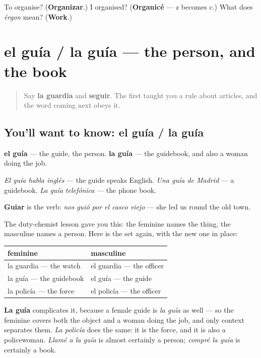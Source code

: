 \begin{tcolorbox}[breakable,colback=teal!4,colframe=teal!35!black,title={Before you move on}]
To organise? (\textbf{Organizar}.) I organised? (\textbf{Organicé} — z becomes c.) What does \emph{érgon} mean? (\textbf{Work}.)
\end{tcolorbox}
\section[el guía / la guía]{el guía / la guía — the person, and the book}

\label{lesson:ES-C463-guia}



\begin{quote}
Say \textbf{la guardia} and \textbf{seguir}. The first taught you a rule about articles, and the word coming next obeys it.
\end{quote}

\subsection*{You'll want to know: el guía / la guía}
\textbf{el guía} — the guide, the person. \textbf{la guía} — the guidebook, and also a woman doing the job.

\emph{El guía habla inglés} — the guide speaks English. \emph{Una guía de Madrid} — a guidebook. \emph{La guía telefónica} — the phone book.

\textbf{Guiar} is the verb: \emph{nos guió por el casco viejo} — she led us round the old town.

\begin{grammarlens}[title={Grammar Lens: the pattern you already met}]
The duty-chemist lesson gave you this: the feminine names the thing, the masculine names a person. Here is the set again, with the new one in place:

\noindent
\begin{tabularx}{\linewidth}{@{}>{\raggedright\arraybackslash}X>{\raggedright\arraybackslash}X@{}}
\toprule
\textbf{feminine} & \textbf{masculine} \\
\midrule
la guardia — the watch & el guardia — the officer \\
la guía — the guidebook & el guía — the guide \\
la policía — the force & el policía — the officer \\
\bottomrule
\end{tabularx}

\textbf{La guía} complicates it, because a female guide is \emph{la guía} as well — so the feminine covers both the object and a woman doing the job, and only context separates them. \emph{La policía} does the same: it is the force, and it is also a policewoman. \emph{Llamé a la guía} is almost certainly a person; \emph{compré la guía} is certainly a book.
\end{grammarlens}

